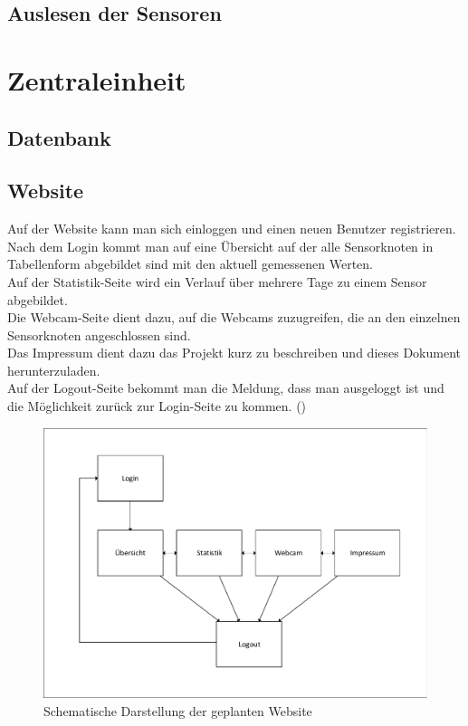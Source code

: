 \subsection{Auslesen der Sensoren}
\section{Zentraleinheit}
\subsection{Datenbank}
\subsection{Website}

Auf der Website kann man sich einloggen und einen neuen Benutzer registrieren.
Nach dem Login kommt man auf eine Übersicht auf der alle Sensorknoten in
Tabellenform abgebildet sind mit den aktuell gemessenen Werten. \\
Auf der Statistik-Seite wird ein Verlauf über mehrere Tage zu einem Sensor
abgebildet.\\
Die Webcam-Seite dient dazu, auf die Webcams zuzugreifen, die an den einzelnen Sensorknoten
angeschlossen sind.\\
Das Impressum dient dazu das Projekt kurz zu beschreiben und dieses Dokument
herunterzuladen.\\
Auf der Logout-Seite bekommt man die Meldung, dass man ausgeloggt ist und die
Möglichkeit zurück zur Login-Seite zu kommen.
()


\begin{figure} [htb]
\begin{centering}
\includegraphics[scale=0.8]{Bilder/struktur_website_einfach.pdf}
\caption[Schematische Darstellung der geplanten Website]{Schematische
Darstellung der geplanten Website}
\label{Darstellung_Website_einfach}
\end{centering}
\end{figure}



